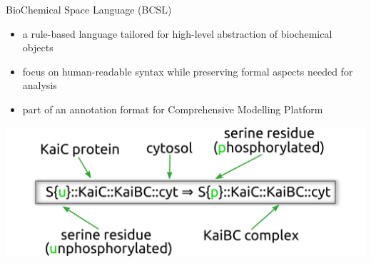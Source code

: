 \documentclass[10pt]{beamer}
\begin{document}

\begin{frame}[fragile]{BioChemical Space Language (BCSL)}

\begin{itemize}
	\item a rule-based language tailored for high-level abstraction of biochemical objects
	\item focus on human-readable syntax while preserving formal aspects needed for analysis
	\item part of an annotation format for Comprehensive Modelling Platform
\end{itemize}

\begin{center}
\hspace*{-0.7cm}\includegraphics[scale=0.45]{pics/equation.png}
\end{center}

\end{frame}


\end{document}
